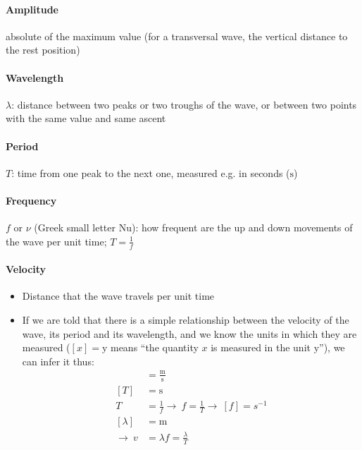 \documentclass[pagesize,headsepline,10pt,parskip=half]{scrreprt}
\newcommand{\eg}{\mbox{e.g.}\xspace}
\begin{document}
          \paragraph{Amplitude}
            absolute of the maximum value (for a transversal wave, the vertical distance to the rest position)
          \paragraph{Wavelength}
            $\lambda$: distance between two peaks or two troughs of the wave,
            or between two points with the same value and same ascent
          \paragraph{Period}
            $T$: time from one peak to the next one, measured \eg{} in seconds ($\mathrm{s}$)
          \paragraph{Frequency}
            $f$ or $\nu$ (Greek small letter Nu): how frequent are the up and down movements of the wave per unit time;
            $T = \frac{1}{f}$
          \paragraph{Velocity}
            \begin{itemize}
              \item Distance that the wave travels per unit time
              \item If we are told that there is a simple relationship between the velocity of the wave,
                its period and its wavelength, and we know the units in which they are measured
                ($[x] = \mathrm{y}$ means “the quantity $x$ is measured in the unit $\mathrm{y}$”),
                we can infer it thus:
                \begin{align*}
                  [v] &= \frac{\mathrm{m}}{\mathrm{s}}\\
                  [T] &= \mathrm{s}\\
                  T &= \frac{1}{f} \rightarrow~f = \frac{1}{T} \rightarrow~[f] = s^{-1}\\
                  [\lambda] &= \mathrm{m}\\
                  \rightarrow~v &= \lambda f = \frac{\lambda}{T}
                \end{align*}
            \end{itemize}
\end{document}
